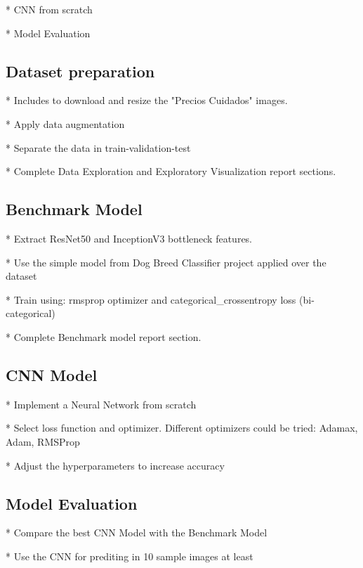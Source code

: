\documentclass[a4paper,10pt]{report}
\begin{document}
* CNN from scratch 

* Model Evaluation


\subsection{Dataset preparation}

* Includes to download and resize the "Precios Cuidados" images.

* Apply data augmentation 

* Separate the data in train-validation-test

* Complete Data Exploration and Exploratory Visualization report sections.

\subsection{Benchmark Model}

* Extract ResNet50 and InceptionV3 bottleneck features.

* Use the simple model from Dog Breed Classifier project applied over the dataset



* Train using: rmsprop optimizer and categorical\_crossentropy loss (bi-categorical) 

* Complete Benchmark model report section.

\subsection{CNN Model}

* Implement a Neural Network from scratch

* Select loss function and optimizer. Different optimizers could be tried: Adamax, Adam, RMSProp

* Adjust the hyperparameters to increase accuracy


\subsection{Model Evaluation}

* Compare the best CNN Model with the Benchmark Model

* Use the CNN for prediting in 10 sample images at least
\end{document}
